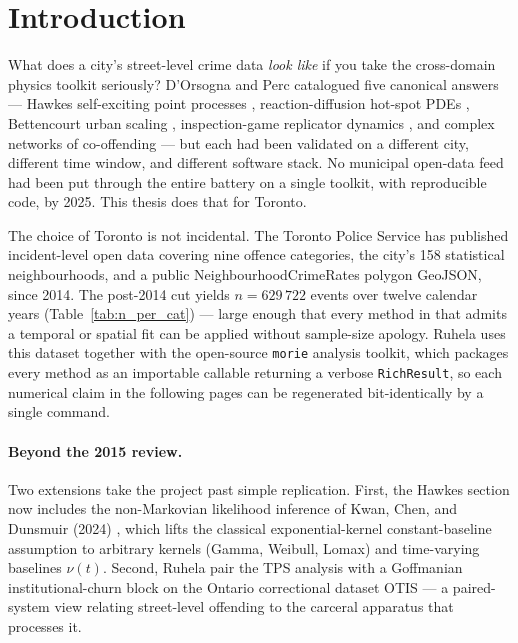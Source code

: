 \documentclass[11pt,a4paper]{article}
\newcommand{\1}{\mathbf{1}}
\theoremstyle{plain}
\theoremstyle{definition}
\begin{document}
\section{Introduction}\label{sec:intro}

What does a city's street-level crime data \emph{look like} if you
take the cross-domain physics toolkit seriously?  D'Orsogna and Perc
\cite{dorsogna2015} catalogued five canonical answers — Hawkes
self-exciting point processes \cite{mohler2011self,short2010pde},
reaction-diffusion hot-spot PDEs \cite{short2008pde}, Bettencourt
urban scaling \cite{bettencourt2007}, inspection-game replicator
dynamics \cite{helbing2010punish}, and complex networks of
co-offending — but each had been validated on a different city,
different time window, and different software stack.  No municipal
open-data feed had been put through the entire battery on a single
toolkit, with reproducible code, by 2025.  This thesis does that
for Toronto.

The choice of Toronto is not incidental.  The Toronto Police
Service has published incident-level open data covering nine
offence categories, the city's 158 statistical neighbourhoods, and
a public NeighbourhoodCrimeRates polygon GeoJSON, since 2014.  The
post-2014 cut yields $n=629\,722$ events over twelve calendar
years (Table~\ref{tab:n_per_cat}) — large enough that every method
in \cite{dorsogna2015} that admits a temporal or spatial fit can
be applied without sample-size apology.  Ruhela uses this dataset
together with the open-source \texttt{morie} analysis toolkit,
which packages every method as an importable callable returning a
verbose \texttt{RichResult}, so each numerical claim in the
following pages can be regenerated bit-identically by a single
command.

\paragraph{Beyond the 2015 review.}  Two extensions take the
project past simple replication.  First, the Hawkes section now
includes the non-Markovian likelihood inference of Kwan, Chen, and
Dunsmuir (2024) \cite{kwan2025nonstationary}, which lifts the
classical exponential-kernel constant-baseline assumption to
arbitrary kernels (Gamma, Weibull, Lomax) and time-varying
baselines $\nu(t)$.  Second, Ruhela pair the TPS analysis with a
Goffmanian institutional-churn block \cite{goffman1961asylums} on
the Ontario correctional dataset OTIS — a paired-system view
relating street-level offending to the carceral apparatus that
processes it.
\end{document}
